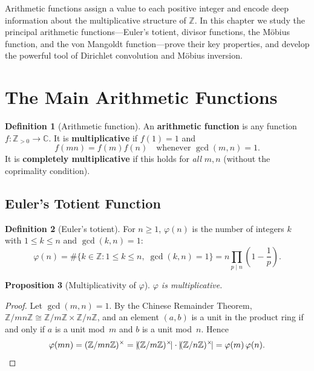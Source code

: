 \documentclass[12pt,a4paper,openany]{book}
\theoremstyle{definition}
\newtheorem{definition}{Definition}[chapter]
\theoremstyle{plain}
\newtheorem{proposition}[definition]{Proposition}
\theoremstyle{remark}
\newcommand{\Z}{\mathbb{Z}}
\newcommand{\C}{\mathbb{C}}
\begin{document}
\noindent
Arithmetic functions assign a value to each positive integer and encode deep
information about the multiplicative structure of $\Z$.  In this chapter we
study the principal arithmetic functions---Euler's totient, divisor functions,
the M\"obius function, and the von Mangoldt function---prove their key
properties, and develop the powerful tool of Dirichlet convolution and
M\"obius inversion.

\section{The Main Arithmetic Functions}\label{sec:arith-func-def}

\begin{definition}[Arithmetic function]\label{def:arith-function}
An \textbf{arithmetic function} is any
function $f \colon \Z_{>0} \to \C$.  It is \textbf{multiplicative}
 if $f(1)=1$ and
\[
  f(mn) = f(m)f(n) \quad \text{whenever } \gcd(m,n) = 1.
\]
It is \textbf{completely multiplicative}
if this holds for \emph{all} $m,n$ (without the coprimality condition).
\end{definition}

\subsection{Euler's Totient Function}\label{subsec:euler-phi}

\begin{definition}[Euler's totient]\label{def:euler-phi}
For $n \ge 1$, $\varphi(n)$ is the number of integers
$k$ with $1 \le k \le n$ and $\gcd(k,n)=1$:
\[
  \varphi(n) = \#\{k \in \Z : 1 \le k \le n,\; \gcd(k,n)=1\}
             = n\prod_{p \mid n}\!\left(1 - \frac{1}{p}\right).
\]
\end{definition}

\begin{proposition}[Multiplicativity of $\varphi$]\label{prop:phi-mult}
$\varphi$ is multiplicative.
\end{proposition}

\begin{proof}
Let $\gcd(m,n) = 1$.  By the Chinese Remainder Theorem,
$\Z/mn\Z \cong \Z/m\Z \times \Z/n\Z$, and an element $(a,b)$ is a unit
in the product ring if and only if $a$ is a unit mod~$m$ and $b$ is a unit
mod~$n$.  Hence
\[
  \varphi(mn) = (\Z/mn\Z)^\times = |\!(\Z/m\Z)^\times\!|
               \cdot |\!(\Z/n\Z)^\times\!|
             = \varphi(m)\,\varphi(n). \qedhere
\]
\end{proof}
\end{document}

